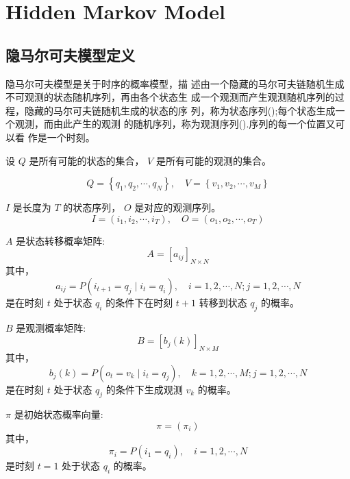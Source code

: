 \chapter{Hidden Markov Model}

\section{隐马尔可夫模型定义}

隐马尔可夫模型是关于时序的概率模型，描
述由一个隐藏的马尔可夫链随机生成不可观测的状态随机序列，再由各个状态生
成一个观测而产生观测随机序列的过程，隐藏的马尔可夫链随机生成的状态的序
列，称为状态序列();每个状态生成一个观测，而由此产生的观测
的随机序列，称为观测序列().序列的每一个位置又可以看
作是一个时刻。 

\begin{definition}[隐马尔可夫模型]
    设 $ Q $ 是所有可能的状态的集合， $ V $ 是所有可能的观测的集合。

\begin{equation}
Q=\left\{q_{1}, q_{2}, \cdots, q_{N}\right\}, \quad V=\left\{v_{1}, v_{2}, \cdots, v_{M}\right\}
\end{equation}

$ I $ 是长度为 $ T $ 的状态序列， $ O $ 是对应的观测序列。
\begin{equation}
I=\left(i_{1}, i_{2}, \cdots, i_{T}\right), \quad O=\left(o_{1}, o_{2}, \cdots, o_{T}\right)
\end{equation}

$ A $ 是状态转移概率矩阵:
\begin{equation}
A=\left[a_{i j}\right]_{N \times N}
\end{equation}
其中，
\begin{equation}
a_{i j}=P\left(i_{t+1}=q_{j} \mid i_{t}=q_{i}\right), \quad i=1,2, \cdots, N ; j=1,2, \cdots, N
\end{equation}
是在时刻 $ t $ 处于状态 $ q_{i} $ 的条件下在时刻 $ t+1 $ 转移到状态 $ q_{j} $ 的概率。

$ B $ 是观测概率矩阵:
\begin{equation}
B=\left[b_{j}(k)\right]_{N \times M}
\end{equation}
其中，
\begin{equation}
b_{j}(k)=P\left(o_{t}=v_{k} \mid i_{t}=q_{j}\right), \quad k=1,2, \cdots, M ; j=1,2, \cdots, N
\end{equation}
是在时刻 $ t $ 处于状态 $ q_{j} $ 的条件下生成观测 $ v_{k} $ 的概率。

$ \pi $ 是初始状态概率向量:
\begin{equation}
\pi=\left(\pi_{i}\right)
\end{equation}
其中，
\begin{equation}
\pi_{i}=P\left(i_{1}=q_{i}\right), \quad i=1,2, \cdots, N
\end{equation}
是时刻 $ t=1 $ 处于状态 $ q_{i} $ 的概率。

\end{definition}

